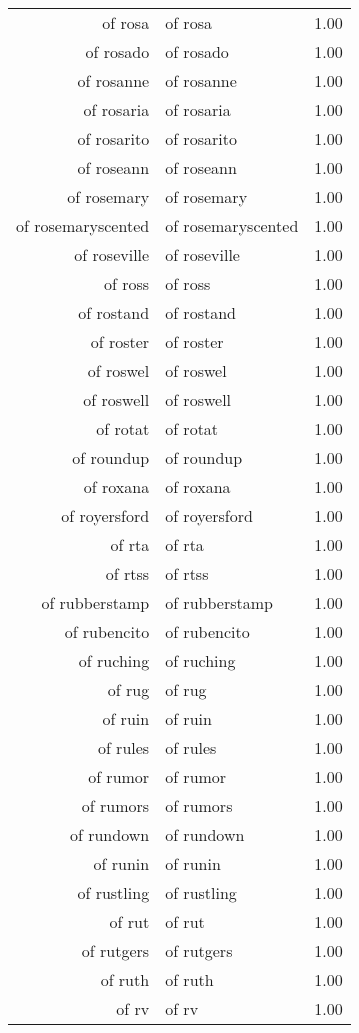 \begin{table}[ht]
\begin{tabular}{rlr}
  of rosa & of rosa & 1.00 \\ 
  of rosado & of rosado & 1.00 \\ 
  of rosanne & of rosanne & 1.00 \\ 
  of rosaria & of rosaria & 1.00 \\ 
  of rosarito & of rosarito & 1.00 \\ 
  of roseann & of roseann & 1.00 \\ 
  of rosemary & of rosemary & 1.00 \\ 
  of rosemaryscented & of rosemaryscented & 1.00 \\ 
  of roseville & of roseville & 1.00 \\ 
  of ross & of ross & 1.00 \\ 
  of rostand & of rostand & 1.00 \\ 
  of roster & of roster & 1.00 \\ 
  of roswel & of roswel & 1.00 \\ 
  of roswell & of roswell & 1.00 \\ 
  of rotat & of rotat & 1.00 \\ 
  of roundup & of roundup & 1.00 \\ 
  of roxana & of roxana & 1.00 \\ 
  of royersford & of royersford & 1.00 \\ 
  of rta & of rta & 1.00 \\ 
  of rtss & of rtss & 1.00 \\ 
  of rubberstamp & of rubberstamp & 1.00 \\ 
  of rubencito & of rubencito & 1.00 \\ 
  of ruching & of ruching & 1.00 \\ 
  of rug & of rug & 1.00 \\ 
  of ruin & of ruin & 1.00 \\ 
  of rules & of rules & 1.00 \\ 
  of rumor & of rumor & 1.00 \\ 
  of rumors & of rumors & 1.00 \\ 
  of rundown & of rundown & 1.00 \\ 
  of runin & of runin & 1.00 \\ 
  of rustling & of rustling & 1.00 \\ 
  of rut & of rut & 1.00 \\ 
  of rutgers & of rutgers & 1.00 \\ 
  of ruth & of ruth & 1.00 \\ 
  of rv & of rv & 1.00 \\ 

\end{tabular}
\end{table}
